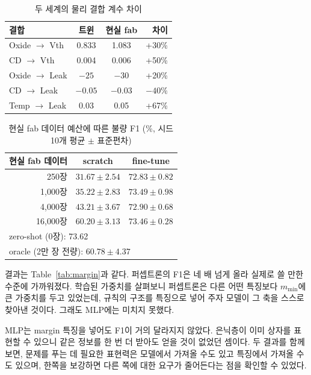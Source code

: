 \documentclass[10pt,twocolumn,a4paper]{article}
\begin{document}
\begin{table}[t]
\centering\small
\caption{두 세계의 물리 결합 계수 차이}
\label{tab:worlds}
\begin{tabular}{lccr}
\toprule
결합 & 트윈 & 현실 fab & 차이 \\
\midrule
Oxide $\rightarrow$ Vth   & 0.833 & 1.083 & +30\% \\
CD $\rightarrow$ Vth      & 0.004 & 0.006 & +50\% \\
Oxide $\rightarrow$ Leak  & $-25$ & $-30$ & +20\% \\
CD $\rightarrow$ Leak     & $-0.05$ & $-0.03$ & $-40\%$ \\
Temp $\rightarrow$ Leak   & 0.03 & 0.05 & +67\% \\
\bottomrule
\end{tabular}
\end{table}

\begin{table}[t]
\centering\small
\caption{현실 fab 데이터 예산에 따른 불량 F1 (\%, 시드 10개 평균 $\pm$ 표준편차)}
\label{tab:sim2real}
\begin{tabular}{rcc}
\toprule
현실 fab 데이터 & scratch & fine-tune \\
\midrule
250장    & $31.67 \pm 2.54$ & $\mathbf{72.83 \pm 0.82}$ \\
1,000장  & $35.22 \pm 2.83$ & $\mathbf{73.49 \pm 0.98}$ \\
4,000장  & $43.21 \pm 3.67$ & $\mathbf{72.90 \pm 0.68}$ \\
16,000장 & $60.20 \pm 3.13$ & $\mathbf{73.46 \pm 0.28}$ \\
\midrule
\multicolumn{3}{l}{zero-shot (0장): 73.62} \\
\multicolumn{3}{l}{oracle (2만 장 전량): $60.78 \pm 4.37$} \\
\bottomrule
\end{tabular}
\end{table}

결과는 Table~\ref{tab:margin}과 같다. 퍼셉트론의 F1은 네 배 넘게 올라 실제로 쓸 만한 수준에
가까워졌다. 학습된 가중치를 살펴보니 퍼셉트론은 다른 어떤 특징보다 $m_{\min}$에 큰 가중치를
두고 있었는데, 규칙의 구조를 특징으로 넣어 주자 모델이 그 축을 스스로 찾아낸 것이다. 그래도
MLP에는 미치지 못했다.

MLP는 margin 특징을 넣어도 F1이 거의 달라지지 않았다. 은닉층이 이미 상자를 표현할 수 있으니
같은 정보를 한 번 더 받아도 얻을 것이 없었던 셈이다. 두 결과를 함께 보면, 문제를 푸는 데
필요한 표현력은 모델에서 가져올 수도 있고 특징에서 가져올 수도 있으며, 한쪽을 보강하면 다른
쪽에 대한 요구가 줄어든다는 점을 확인할 수 있었다.
\end{document}

